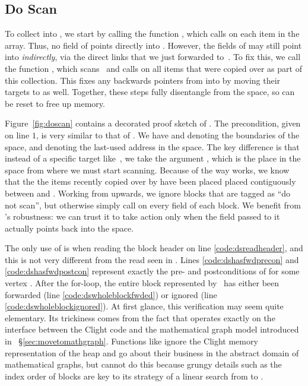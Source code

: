 \subsection{Do Scan}

To collect  into , 
we start by calling the function , which calls  
on each item in the  array. 
Thus, no field of  points directly into . 
However, the fields of  may still point into  \emph{indirectly}, 
via the direct links that we just forwarded to~.
To fix this, we call the function 
, which scans~ and calls 
 on all items that were copied over as part of this collection.
This fixes any backwards pointers from  into  by moving
their targets to  as well.
Together, these steps fully disentangle  from the 
 space, so  can be reset to free up memory. 



Figure~\ref{fig:doscan} contains a decorated proof sketch of .
The precondition, given on line $1$, is very similar to that of 
. We have  and  denoting the boundaries
of the  space, and  denoting the last-used address
in the  space. The key difference is that instead of a specific
target like~, we take the argument , 
which is the place in the  space from where we must start scanning.
Because of the way  works, we know that the 
the items recently copied over by  
have been placed placed contiguously between  and . 
Working from  upwards, we ignore blocks that are tagged as 
``do not scan'', but otherwise simply call  on every field
of each block. We benefit from 's robustness: we can trust it to 
take action only when the field passed to it actually points back into the 
 space. 

The only use of  is when
reading the block header on line \ref{code:dsreadheader}, 
and this is not very different from the read seen in . 
Lines \ref{code:dshasfwdprecon} and \ref{code:dshasfwdpostcon} 
represent exactly the pre- and postconditions of 
for some vertex . 
After the for-loop, the entire block represented by~ has either been
forwarded (line \ref{code:dswholeblockfwded}) or 
ignored (line \ref{code:dswholeblockignored}). 
At first glance, this verification may seem quite elementary. 
Its trickiness comes from the fact
that  operates exactly on the interface between the Clight code 
and the mathematical graph model introduced in ~\S\ref{sec:movetomathgraph}.
Functions like  ignore the Clight memory representation 
of the heap and go about their business in the abstract domain
of mathematical graphs, but  cannot do this because grungy 
details such as the index order of blocks are key to its strategy of a
linear search from  to .

